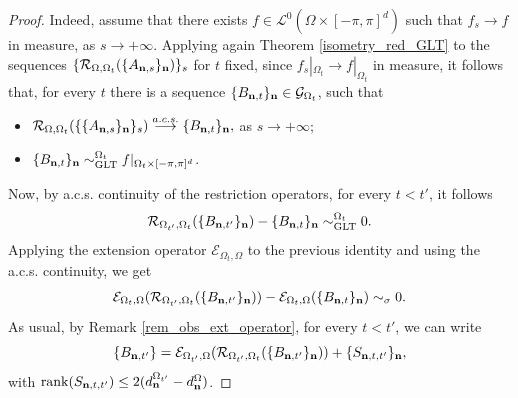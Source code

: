 \documentclass[10pt,a4paper]{amsart}
\begin{document}
\begin{proof}
    Indeed, assume that there exists $f\in\mathcal{L}^0(\Omega\times[-\pi,\pi]^d)$ such that $f_s\to f$ in measure, as $s\to+\infty$. Applying again Theorem \ref{isometry_red_GLT} to the sequences $\{\mathcal{R}_{\Omega,\Omega_t}(\{A_{\mathbf n,s}\}_\mathbf n)\}_s$ for $t$ fixed, since $f_s|_{\Omega_t}\to f|_{\Omega_t}$ in measure, it follows that, for every $t$ there is a sequence $\{B_{\mathbf n,t}\}_\mathbf n\in\mathcal{G}_{\Omega_t}$, such that
    \begin{itemize}
        \item $\mathcal{R}_{\Omega,\Omega_t}(\{\{A_{\mathbf n,s}\}_\mathbf n\}_s)\overset{a.c.s.}{\longrightarrow}\{B_{\mathbf n,t}\}_\mathbf n,$ as $s\to+\infty;$
        \item $\{B_{\mathbf n,t}\}_\mathbf n\sim_{\mathrm{GLT}}^{\Omega_t}f|_{\Omega_t\times[-\pi,\pi]^d}$.
    \end{itemize}
    Now, by a.c.s. continuity of the restriction operators, for every $t<t'$, it follows
    \begin{equation*}
        \mathcal{R}_{\Omega_{t'},\Omega_t}(\{B_{\mathbf n,t'}\}_\mathbf n)-\{B_{\mathbf n,t}\}_\mathbf n\sim_{\mathrm{GLT}}^{\Omega_t}0.
    \end{equation*}
    Applying the extension operator $\mathcal{E}_{\Omega_t,\Omega}$ to the previous identity and using the a.c.s. continuity, we get
    \begin{equation}\label{acs_eq_1}
        \mathcal{E}_{\Omega_t,\Omega}(\mathcal{R}_{\Omega_{t'},\Omega_t}(\{B_{\bfn,t'}\}_\bfn))-\mathcal{E}_{\Omega_t,\Omega}(\{B_{\bfn,t}\}_\bfn)\sim_{\sigma}0.
    \end{equation}
    As usual, by Remark \ref{rem_obs_ext_operator}, for every $t<t'$, we can write
    \begin{equation}\label{acs_eq_2}
        \{B_{\bfn,t'}\}=\mathcal{E}_{\Omega_{t'},\Omega}(\mathcal{R}_{\Omega_{t'},\Omega_t}(\{B_{\bfn,t'}\}_\bfn))+\{S_{\bfn,t,t'}\}_\bfn,
    \end{equation}
    with $\mathrm{rank}(S_{\mathbf n,t,t'})\leq 2(d_\mathbf n^{\Omega_{t'}}-d_\mathbf n^{\Omega})$.
    

\end{proof}
\end{document}
